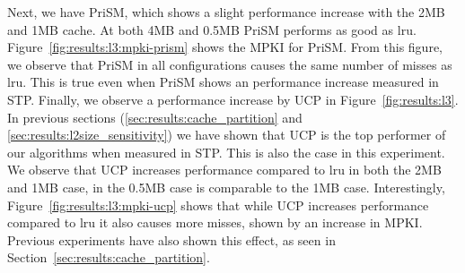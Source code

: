 Next, we have PriSM, which shows a slight performance increase with the 2MB and 1MB cache. 
At both 4MB and 0.5MB PriSM performs as good as \gls{lru}.
Figure~\ref{fig:results:l3:mpki-prism} shows the MPKI for PriSM.
From this figure, we observe that PriSM in all configurations causes the same number of misses as \gls{lru}.
This is true even when PriSM shows an performance increase measured in STP.
Finally, we observe a performance increase by UCP in Figure~\ref{fig:results:l3}. 
In previous sections (\ref{sec:results:cache_partition} and \ref{sec:results:l2size_sensitivity}) we have shown that UCP is the top performer of our algorithms when measured in STP.
This is also the case in this experiment.
We observe that UCP increases performance compared to \gls{lru} in both the 2MB and 1MB case, in the 0.5MB case is comparable to the 1MB case.
Interestingly, Figure~\ref{fig:results:l3:mpki-ucp} shows that while UCP increases performance compared to \gls{lru} it also causes more misses, shown by an increase in MPKI.
Previous experiments have also shown this effect, as seen in Section~\ref{sec:results:cache_partition}.
